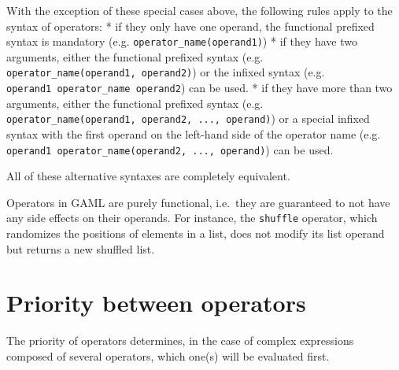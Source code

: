 \documentclass[]{book}
\theoremstyle{definition}
\theoremstyle{definition}
\theoremstyle{definition}
\theoremstyle{remark}
\begin{document}
With the exception of these special cases above, the following rules
apply to the syntax of operators: * if they only have one operand, the
functional prefixed syntax is mandatory (e.g.
\texttt{operator\_name(operand1)}) * if they have two arguments, either
the functional prefixed syntax (e.g.
\texttt{operator\_name(operand1,\ operand2)}) or the infixed syntax
(e.g. \texttt{operand1\ operator\_name\ operand2}) can be used. * if
they have more than two arguments, either the functional prefixed syntax
(e.g. \texttt{operator\_name(operand1,\ operand2,\ ...,\ operand)}) or a
special infixed syntax with the first operand on the left-hand side of
the operator name (e.g.
\texttt{operand1\ operator\_name(operand2,\ ...,\ operand)}) can be
used.

All of these alternative syntaxes are completely equivalent.

Operators in GAML are purely functional, i.e.~they are guaranteed to not
have any side effects on their operands. For instance, the
\texttt{shuffle} operator, which randomizes the positions of elements in
a list, does not modify its list operand but returns a new shuffled
list.

\section{\texorpdfstring{}{ }}\label{section-19}

\section{Priority between operators}\label{priority-between-operators-1}

The priority of operators determines, in the case of complex expressions
composed of several operators, which one(s) will be evaluated first.
\end{document}
